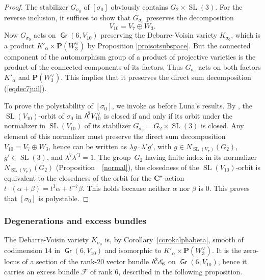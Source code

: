 \documentclass[11pt]{article}
\providecommand{\C}{}
\let\mathcal\mathscr
\theoremstyle{definition}
\renewcommand\C{{\mathbf C}}\let\CC\C
\renewcommand\P{{\mathbf P}}\let\PP\P
\newcommand\cE{\mathcal{E}}
\newcommand\cF{\mathcal{F}}
\DeclareMathOperator{\Gr}{\mathsf{Gr}}
\DeclareMathOperator{\SL}{SL}
\newcommand\bw[1]{{\hbox{\large$\mathsf{\Lambda}$}^{\!#1}}}
\begin{document}
\begin{proof} The stabilizer $G_{\sigma_0}$ of $[\sigma_0]$ obviously contains $G_2\times \SL(3)$. For the reverse inclusion, it suffices to show that $G_{\sigma_0}$ preserves the decomposition
\begin{equation}
\label{eqdec7juil}
V_{10}=V_7\oplus W_3.
\end{equation}
Now $G_{\sigma_0}$ acts on $\Gr(6,V_{10})$ preserving
the Debarre-Voisin variety $K_{\sigma_0}$, which is a product \mbox{$K'_\alpha\times \P(W_3^\vee)$} by Proposition
\ref{proisotsubspace}. But the connected component of the auto\-morphism group of a product
of projective varieties is the product of the connected components of its factors. Thus
$G_{\sigma_0}$ acts on both factors $K'_\alpha$ and $\P(W_3^\vee)$. This implies that it preserves the direct sum decomposition
(\ref{eqdec7juil}).

To prove the polystability of $[\sigma_0]$, we invoke as before Luna's results. By \cite[Cor.\,1]{luna}, the $\SL(V_{10})$-orbit of $\sigma_0$ in $\bw3V_{10}^\vee$ is closed if and only if its orbit under the normalizer in $\SL(V_{10})$ of its stabilizer $G_{\sigma_0}=G_2\times \SL(3)$ is closed. Any element of this normalizer must preserve the direct sum decomposition $V_{10}=V_7\oplus W_3$, hence can be written
as $ \lambda g \cdot \lambda' g' $, with $g \in N_{\SL(V_7)}(G_2)$, $g'\in \SL(3)$, and $\lambda^7\lambda^{\prime 3}=1$.
The group~$G_2$ having finite index in its normalizer $N_{\SL(V_7)}(G_2)$ (Proposition~~\ref{normal}), the closedness of
the $\SL(V_{10})$-orbit
is equivalent to the closedness of
the orbit for the $\C^\star$-action $t\cdot (\alpha+\beta)=t^3\alpha+t^{-7}\beta$. This holds because neither $\alpha$ nor $\beta$ is $0$. This proves that $[\sigma_0]$ is polystable.
\end{proof}

\subsubsection{Degenerations and excess bundles}

The Debarre-Voisin variety $K_{\sigma_0}$ is, by Corollary~\ref{corokalphabeta}, smooth of codimension $14$
in $\Gr(6,V_{10})$ and isomorphic to $K'_\alpha\times \P(W_3^\vee)$. It is the zero-locus of a section
of the rank-$20$ vector bundle $\bw3\cE_6$ on $\Gr(6,V_{10})$, hence it carries
an excess bundle $\cF$ of rank $6$, described in the
following proposition.
\end{document}
